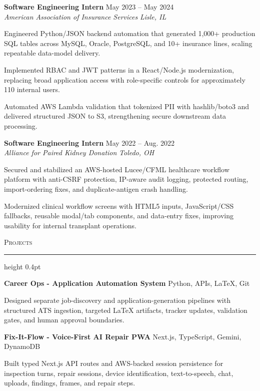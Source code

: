 \documentclass[letterpaper,11pt]{article}
\newcommand{\resumesection}[1]{%
  \par\vspace{2pt}%
  {\large\scshape #1}\par\vspace{2pt}%
  \hrule height 0.4pt\vspace{2pt}%
}
\newcommand{\resumeSubheading}[4]{
  \textbf{#1} \hfill #2\\
  \textit{#3} \hfill \textit{#4}
}
\newcommand{\projectHeading}[2]{
  \textbf{#1} \hfill #2
}
\begin{document}
\resumeSubheading
{Software Engineering Intern}{May 2023 -- May 2024}
{American Association of Insurance Services}{Lisle, IL}
\begin{tightitemize}
  \item Engineered Python/JSON backend automation that generated 1,000+ production SQL tables across MySQL, Oracle, PostgreSQL, and 10+ insurance lines, scaling repeatable data-model delivery.
  \item Implemented RBAC and JWT patterns in a React/Node.js modernization, replacing broad application access with role-specific controls for approximately 110 internal users.
  \item Automated AWS Lambda validation that tokenized PII with hashlib/boto3 and delivered structured JSON to S3, strengthening secure downstream data processing.
\end{tightitemize}

\resumeSubheading
{Software Engineering Intern}{May 2022 -- Aug. 2022}
{Alliance for Paired Kidney Donation}{Toledo, OH}
\begin{tightitemize}
  \item Secured and stabilized an AWS-hosted Lucee/CFML healthcare workflow platform with anti-CSRF protection, IP-aware audit logging, protected routing, import-ordering fixes, and duplicate-antigen crash handling.
  \item Modernized clinical workflow screens with HTML5 inputs, JavaScript/CSS fallbacks, reusable modal/tab components, and data-entry fixes, improving usability for internal transplant operations.
\end{tightitemize}

\resumesection{Projects}
\projectHeading{Career Ops - Application Automation System}{Python, APIs, LaTeX, Git}
\begin{tightitemize}
  \item Designed separate job-discovery and application-generation pipelines with structured ATS ingestion, targeted LaTeX artifacts, tracker updates, validation gates, and human approval boundaries.
\end{tightitemize}

\projectHeading{Fix-It-Flow - Voice-First AI Repair PWA}{Next.js, TypeScript, Gemini, DynamoDB}
\begin{tightitemize}
  \item Built typed Next.js API routes and AWS-backed session persistence for inspection turns, repair sessions, device identification, text-to-speech, chat, uploads, findings, frames, and repair steps.
\end{tightitemize}
\end{document}
